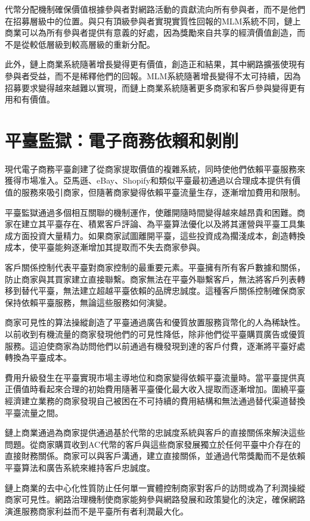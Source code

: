 \documentclass[
  Letterpaper,
]{scrbook}
\begin{document}
代幣分配機制確保價值根據參與者對網路活動的貢獻流向所有參與者，而不是他們在招募層級中的位置。與只有頂級參與者實現實質性回報的MLM系統不同，鏈上商業可以為所有參與者提供有意義的好處，因為獎勵來自共享的經濟價值創造，而不是從較低層級到較高層級的重新分配。

此外，鏈上商業系統隨著增長變得更有價值，創造正和結果，其中網路擴張使現有參與者受益，而不是稀釋他們的回報。MLM系統隨著增長變得不太可持續，因為招募要求變得越來越難以實現，而鏈上商業系統隨著更多商家和客戶參與變得更有用和有價值。

\section{平臺監獄：電子商務依賴和剝削}\label{ux5e73ux81faux76e3ux7344ux96fbux5b50ux5546ux52d9ux4f9dux8cf4ux548cux525dux524a}

現代電子商務平臺創建了從商家提取價值的複雜系統，同時使他們依賴平臺服務來獲得市場准入。亞馬遜、eBay、Shopify和類似平臺最初通過以合理成本提供有價值的服務來吸引商家，但隨著商家變得依賴平臺流量生存，逐漸增加費用和限制。

平臺監獄通過多個相互關聯的機制運作，使離開隨時間變得越來越昂貴和困難。商家在建立其平臺存在、積累客戶評論、為平臺算法優化以及將其運營與平臺工具集成方面投資大量精力。如果商家試圖離開平臺，這些投資成為擱淺成本，創造轉換成本，使平臺能夠逐漸增加其提取而不失去商家參與。

客戶關係控制代表平臺對商家控制的最重要元素。平臺擁有所有客戶數據和關係，防止商家與其買家建立直接聯繫。商家無法在平臺外聯繫客戶，無法將客戶列表轉移到替代平臺，無法建立超越平臺依賴的品牌忠誠度。這種客戶關係控制確保商家保持依賴平臺服務，無論這些服務如何演變。

商家可見性的算法操縱創造了平臺通過廣告和優質放置服務貨幣化的人為稀缺性。以前收到有機流量的商家發現他們的可見性降低，除非他們從平臺購買廣告或優質服務。這迫使商家為訪問他們以前通過有機發現到達的客戶付費，逐漸將平臺好處轉換為平臺成本。

費用升級發生在平臺實現市場主導地位和商家變得依賴平臺流量時。當平臺提供真正價值時看起來合理的初始費用隨著平臺優化最大收入提取而逐漸增加。圍繞平臺經濟建立業務的商家發現自己被困在不可持續的費用結構和無法通過替代渠道替換平臺流量之間。

鏈上商業通過為商家提供通過基於代幣的忠誠度系統與客戶的直接關係來解決這些問題。從商家購買收到AC代幣的客戶與這些商家發展獨立於任何平臺中介存在的直接財務關係。商家可以與客戶溝通，建立直接關係，並通過代幣獎勵而不是依賴平臺算法和廣告系統來維持客戶忠誠度。

鏈上商業的去中心化性質防止任何單一實體控制商家對客戶的訪問或為了利潤操縱商家可見性。網路治理機制使商家能夠參與網路發展和政策變化的決定，確保網路演進服務商家利益而不是平臺所有者利潤最大化。
\end{document}
